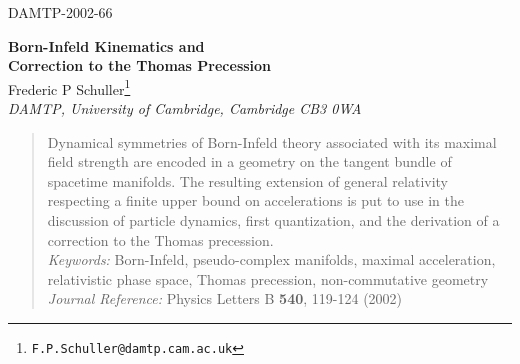 \documentclass[11pt,a4paper,twoside]{article}
\begin{document}
\thispagestyle{plain}\enlargethispage{12pt}

\hspace{11cm} DAMTP-2002-66\\
\begin{center}
\textbf{\huge Born-Infeld Kinematics and\\[12pt] Correction to the Thomas Precession}\\[20pt]
{\large Frederic P Schuller\footnote{{\tt F.P.Schuller@damtp.cam.ac.uk}}}\\[10pt]
\textsl{DAMTP, University of Cambridge, Cambridge CB3 0WA}\\[10pt]

\begin{quote}
Dynamical symmetries of Born-Infeld theory associated with its maximal
field strength are encoded in a geometry on the tangent bundle of
spacetime manifolds. The resulting extension of
general relativity respecting a finite upper bound on accelerations is
put to use in the discussion of particle dynamics, first quantization,
and the derivation of a correction to the Thomas precession.\\[20pt]

\textsl{Keywords:} Born-Infeld, pseudo-complex manifolds, maximal acceleration,
relativistic phase space, Thomas precession, non-commutative
geometry\\[20pt]

\textsl{Journal Reference:} Physics Letters B \textbf{540},
119-124 (2002)
\end{quote}
\end{center}
\end{document}
